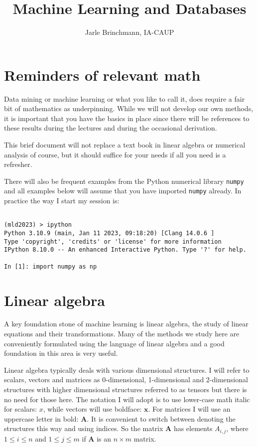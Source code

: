 \documentclass[a4paper,10pt]{article}
\begin{document}
\renewcommand{\maketitlehooka}{\sffamily\color{Mahogany}}
\title{Machine Learning and Databases}
\author{Jarle Brinchmann, IA-CAUP}
\maketitle
 
 \section{ Reminders of relevant math}

 Data mining or machine learning or what you like to call it, does
 require a fair bit of mathematics as underpinning. While we will not
 develop our own methods, it is important that you have the basics in
 place since there will be references to these results during the
 lectures and during the occasional derivation.

 This brief document will not replace a text book in linear algebra or
 numerical analysis of course, but it should suffice for your needs if
 all you need is a refresher.

 There will also be frequent examples from the Python numerical
 library \texttt{numpy} and all examples below will assume that you
 have imported \texttt{numpy} already. In practice the way I start my
 session is:
\begin{lstlisting}

(mld2023) > ipython
Python 3.10.9 (main, Jan 11 2023, 09:18:20) [Clang 14.0.6 ]
Type 'copyright', 'credits' or 'license' for more information
IPython 8.10.0 -- An enhanced Interactive Python. Type '?' for help.

In [1]: import numpy as np
\end{lstlisting}

\section{ Linear algebra}

A key foundation stone of machine learning is linear algebra, the
study of linear equations and their transformations. Many of the
methods we study here are conveniently formulated using the language
of linear algebra and a good foundation in this area is very useful.

Linear algebra typically deals with various dimensional structures. I
will refer to scalars, vectors and matrices as 0-dimensional,
1-dimensional and 2-dimensional structures with higher dimensional
structures referred to as tensors but there is no need for those
here. The notation I will adopt is to use lower-case math italic for
scalars: $x$, while vectors will use boldface: $\mathbf{x}$. For
matrices I will use an uppercase letter in bold: $\mathbf{A}$. It is
convenient to switch between denoting the structures this way and
using indices. So the matrix $\mathbf{A}$ has elements $A_{i, j}$,
where $1\le i\le n$ and $1 \le j \le m$ if $\mathbf{A}$ is an
$n\times m$ matrix.
 
\end{document}
